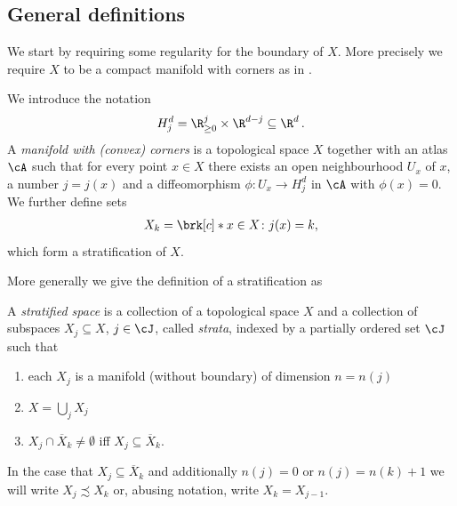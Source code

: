 \subsection{General definitions}

We start by requiring some regularity for the boundary of $X$.
More precisely we require $X$ to be a compact manifold with corners as in \cite{Handron2002}.
\begin{definition}
  We introduce the notation
  \begin{align*}
    H_j^d=\R_{\geq0}^j\times\R^{d-j}\subseteq\R^d\,.
  \end{align*}
  A \emph{manifold with (convex) corners} is a topological space $X$ together with an atlas $\cA$ such that for every point
  $x\in X$ there exists an open neighbourhood $U_x$ of $x$, a number $j=j(x)$ and a
  diffeomorphism $\phi\colon U_x\to H_j^d$ in $\cA$ with $\phi(x)=0$.
  We further define sets 
  \begin{align}
    X_k=\brk[c]*{x\in X\colon j(x)=k}\label{eq:def_mfCorners_stratification},
  \end{align}
  which form a stratification of $X$.
\end{definition}

More generally we give the definition of a stratification as 
\begin{definition}\label{df:stratified_space}
  A \emph{stratified space} is a collection of a topological space $X$ and a collection of subspaces
  $X_j\subseteq X$, $j\in\cJ$, called \emph{strata},  indexed by a partially ordered set $\cJ$ such that
  \begin{enumerate}
    \item each $X_j$ is a manifold (without boundary) of dimension $n=n(j)$
    \item $X=\bigcup_jX_j$
    \item $X_j\cap \overline{X}_k\neq\emptyset$ iff $X_j\subseteq\overline{X}_k$.
  \end{enumerate}
  In the case that $X_j\subseteq\overline{X}_k$ and additionally $n(j)=0$ or $n(j)=n(k)+1$ we will
  write $X_j\precsim X_k$ or, abusing notation, write $X_k=X_{j-1}$.
\end{definition}

